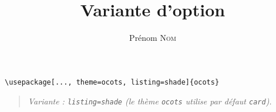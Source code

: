 \documentclass[11pt]{ocots-book}
\title{Variante d'option}
\author{Prénom \textsc{Nom}}
\newcommand{\ocotsvariantnote}[1]{\begin{quote}\itshape Variante : #1\end{quote}}
\begin{document}
\maketitle

\begin{lstlisting}
\usepackage[..., theme=ocots, listing=shade]{ocots}
\end{lstlisting}
\ocotsvariantnote{\texttt{listing=shade} (le th\`eme \texttt{ocots} utilise par d\'efaut \texttt{card}).}

\end{document}
